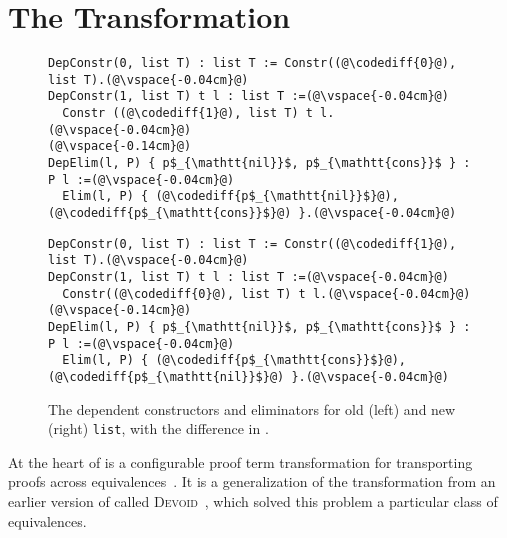 \section{The Transformation}
\label{sec:key2}

\begin{figure*}
\begin{minipage}{0.48\textwidth}
\begin{lstlisting}
DepConstr(0, list T) : list T := Constr((@\codediff{0}@), list T).(@\vspace{-0.04cm}@)
DepConstr(1, list T) t l : list T :=(@\vspace{-0.04cm}@)
  Constr ((@\codediff{1}@), list T) t l.(@\vspace{-0.04cm}@)
(@\vspace{-0.14cm}@)
DepElim(l, P) { p$_{\mathtt{nil}}$, p$_{\mathtt{cons}}$ } : P l :=(@\vspace{-0.04cm}@)
  Elim(l, P) { (@\codediff{p$_{\mathtt{nil}}$}@), (@\codediff{p$_{\mathtt{cons}}$}@) }.(@\vspace{-0.04cm}@)
\end{lstlisting}
\end{minipage}
\hfill
\begin{minipage}{0.48\textwidth}
\begin{lstlisting}
DepConstr(0, list T) : list T := Constr((@\codediff{1}@), list T).(@\vspace{-0.04cm}@)
DepConstr(1, list T) t l : list T :=(@\vspace{-0.04cm}@)
  Constr((@\codediff{0}@), list T) t l.(@\vspace{-0.04cm}@)
(@\vspace{-0.14cm}@)
DepElim(l, P) { p$_{\mathtt{nil}}$, p$_{\mathtt{cons}}$ } : P l :=(@\vspace{-0.04cm}@)
  Elim(l, P) { (@\codediff{p$_{\mathtt{cons}}$}@), (@\codediff{p$_{\mathtt{nil}}$}@) }.(@\vspace{-0.04cm}@)
\end{lstlisting}
\end{minipage}
\vspace{-0.3cm}
\caption{The dependent constructors and eliminators for old (left) and new (right) \lstinline{list}, with the difference in .}
\vspace{-0.1cm}
\label{fig:listconfig}
\end{figure*}

At the heart of \toolname is a configurable proof term transformation for transporting
proofs across equivalences~\href{https://github.com/uwplse/pumpkin-pi/blob/silent/plugin/src/automation/lift/lift.ml}{}. %
It is a generalization of the transformation from an earlier version of \toolname called
\textsc{Devoid}~\cite{Ringer2019}, which solved this problem a particular class of equivalences.

